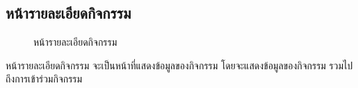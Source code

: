 \documentclass[14pt,oneside,openright,a4paper]{cpe-thai-project}
\begin{document}
\subsection{หน้ารายละเอียดกิจกรรม}
\begin{figure}[!h]\centering
  \setlength{\fboxrule}{0.5mm} %
  \setlength{\fboxsep}{0.5cm}
  \caption{หน้ารายละเอียดกิจกรรม}\label{fig:ui8}
\end{figure}
\hspace*{1cm} หน้ารายละเอียดกิจกรรม จะเป็นหน้าที่แสดงข้อมูลของกิจกรรม โดยจะแสดงข้อมูลของกิจกรรม รวมไปถึงการเข้าร่วมกิจกรรม

\newpage
\end{document}
